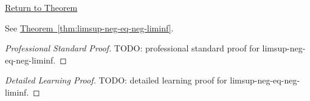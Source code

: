 \newpage
{}
\label{prf:limsup-neg-eq-neg-liminf}

\begin{remark*}[Return]
\hyperref[thm:limsup-neg-eq-neg-liminf]{Return to Theorem}
\end{remark*}

\begin{theorem*}
See \hyperref[thm:limsup-neg-eq-neg-liminf]{Theorem~\ref*{thm:limsup-neg-eq-neg-liminf}}.
\end{theorem*}

\begin{proof}[Professional Standard Proof]
\LRAProofBodyStart
TODO: professional standard proof for limsup-neg-eq-neg-liminf.
\end{proof}

\begin{proof}[Detailed Learning Proof]
\LRAProofBodyStart
TODO: detailed learning proof for limsup-neg-eq-neg-liminf.
\end{proof}

\begin{remark*}
\end{remark*}

\begin{dependencies}
\NoLocalDependencies
\end{dependencies}

\clearpage
